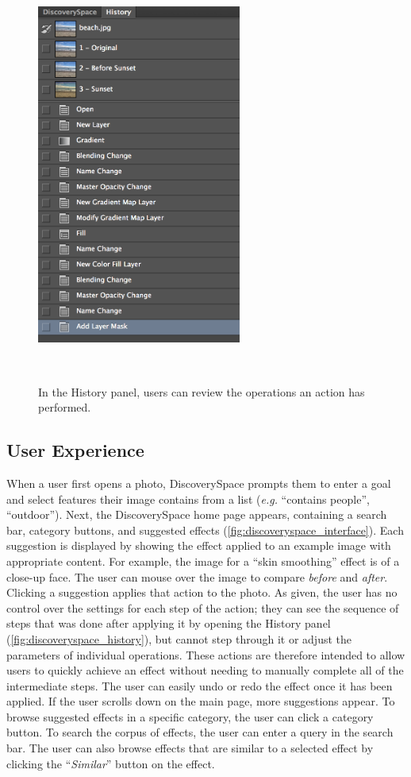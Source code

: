 \begin{figure}
\centering
  \includegraphics[width=0.6\textwidth]{discoveryspace/figures/history.png}
  \caption{In the History panel, users can review the operations an action has performed.}~\label{fig:discoveryspace_history}
\end{figure}

\subsection{User Experience}
When a user first opens a photo, Discovery\-Space prompts them to enter a goal and select features their image contains from a list (\textit{e.g.} ``contains people'', ``outdoor''). Next, the Discovery\-Space home page appears, containing a search bar, category buttons, and suggested effects (\autoref{fig:discoveryspace_interface}). Each suggestion is displayed by showing the effect applied to an example image with appropriate content. For example, the image for a ``skin smoothing'' effect is of a close-up face. The user can mouse over the image to compare \textit{before} and \textit{after}. Clicking a suggestion applies that action to the photo. As given, the user has no control over the settings for each step of the action; they can see the sequence of steps that was done after applying it by opening the History panel (\autoref{fig:discoveryspace_history}), but cannot step through it or adjust the parameters of individual operations. These actions are therefore intended to allow users to quickly achieve an effect without needing to manually complete all of the intermediate steps. The user can easily undo or redo the effect once it has been applied. If the user scrolls down on the main page, more suggestions appear. To browse suggested effects in a specific category, the user can click a category button. To search the corpus of effects, the user can enter a query in the search bar. The user can also browse effects that are similar to a selected effect by clicking the ``\textit{Similar}'' button on the effect. 

